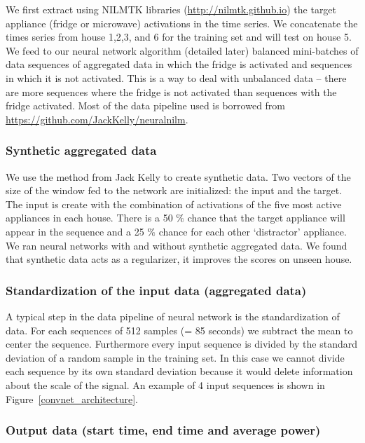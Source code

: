 \documentclass[11pt]{article}
\begin{document}
We first extract using NILMTK libraries (\url{http://nilmtk.github.io}) the target appliance (fridge or microwave) activations in the time series. We concatenate the times series from house 1,2,3, and 6 for the training set and will test on house 5. We feed to our neural network algorithm (detailed later) balanced mini-batches of data sequences of aggregated data in which the fridge is activated and sequences in which it is not activated. This is a way to deal with unbalanced data -- there are more sequences where the fridge is not activated than sequences with the fridge activated. Most of the data pipeline used is borrowed from \url{https://github.com/JackKelly/neuralnilm}.

\subsubsection{Synthetic aggregated data}

We use the method from Jack Kelly to create synthetic data. Two vectors of the size of the window fed to the network are initialized: the input and the target. The input is create with the combination of activations of the five most active appliances in each house. There is a 50 $\%$ chance that the target appliance will appear in the sequence and a 25 $\%$ chance for each other `distractor' appliance. We ran neural networks with and without synthetic aggregated data. We found that synthetic data acts as a regularizer, it improves the scores on unseen house.

\subsubsection{Standardization of the input data (aggregated data)}

A typical step in the data pipeline of neural network is the standardization of data. For each sequences of 512 samples (= 85 seconds) we subtract the mean to center the sequence. Furthermore every input sequence is divided by the standard deviation of a random sample in the training set. In this case we cannot divide each sequence by its own standard deviation because it would delete information about the scale of the signal. An example of 4 input sequences is shown in Figure~\ref{convnet_architecture}. 

\subsubsection{Output data (start time, end time and average power)}
\end{document}
